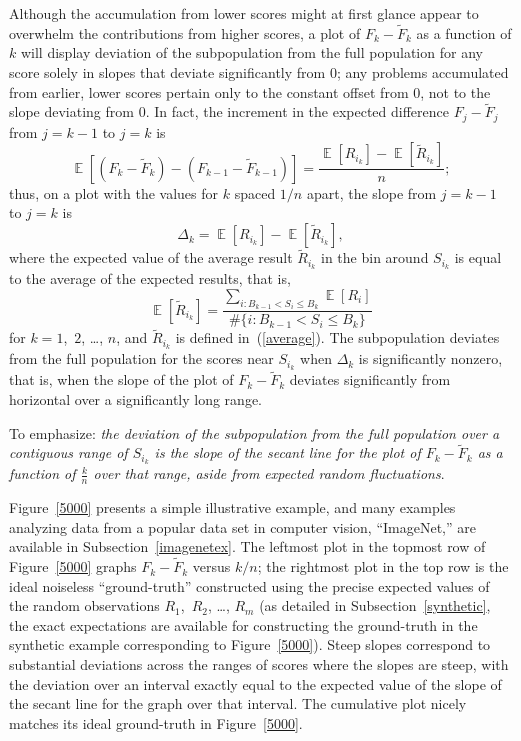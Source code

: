 \documentclass{article}
\DeclareMathOperator{\E}{\mathop{}\mathbb{E}}
\begin{document}
Although the accumulation from lower scores might at first glance appear
to overwhelm the contributions from higher scores,
a plot of $F_k-\tilde{F}_k$ as a function of $k$ will display deviation
of the subpopulation from the full population
for any score solely in slopes that deviate significantly from 0;
any problems accumulated from earlier, lower scores pertain
only to the constant offset from 0, not to the slope deviating from 0.
In fact, the increment in the expected difference $F_j-\tilde{F}_j$
from $j = k-1$ to $j = k$ is
%
\begin{equation}
\E[ (F_k-\tilde{F}_k) - (F_{k-1}-\tilde{F}_{k-1}) ]
= \frac{\E[ R_{i_k} ] - \E[ \tilde{R}_{i_k} ]}{n};
\end{equation}
%
thus, on a plot with the values for $k$ spaced $1/n$ apart,
the slope from $j = k-1$ to $j = k$ is
%
\begin{equation}
\label{delta}
\Delta_k = \E[ R_{i_k} ] - \E[ \tilde{R}_{i_k} ],
\end{equation}
%
where the expected value of the average result $\tilde{R}_{i_k}$
in the bin around $S_{i_k}$ is equal to the average of the expected results,
that is,
%
\begin{equation}
\label{linearity}
\E[ \tilde{R}_{i_k} ] = \frac{\sum_{i : B_{k-1} < S_i \le B_k} \E[ R_i ]}
                             {\#\{i : B_{k-1} < S_i \le B_k\}}
\end{equation}
%
for $k = 1$,~$2$, \dots, $n$,
and $\tilde{R}_{i_k}$ is defined in~(\ref{average}).
The subpopulation deviates from the full population for the scores near
$S_{i_k}$ when $\Delta_k$ is significantly nonzero, that is, when the slope
of the plot of $F_k-\tilde{F}_k$ deviates significantly from horizontal
over a significantly long range.

To emphasize: {\it the deviation of the subpopulation from the full population
over a contiguous range of $S_{i_k}$
is the slope of the secant line for the plot of $F_k-\tilde{F}_k$
as a function of $\frac{k}{n}$ over that range,
aside from expected random fluctuations}.

Figure~\ref{5000} presents a simple illustrative example,
and many examples analyzing data from a popular data set in computer vision,
``ImageNet,'' are available in Subsection~\ref{imagenetex}.
The leftmost plot in the topmost row of Figure~\ref{5000}
graphs $F_k-\tilde{F}_k$ versus $k/n$; the rightmost plot in the top row
is the ideal noiseless ``ground-truth'' constructed using the precise
expected values of the random observations $R_1$,~$R_2$, \dots, $R_m$
(as detailed in Subsection~\ref{synthetic},
the exact expectations are available for constructing the ground-truth
in the synthetic example corresponding to Figure~\ref{5000}).
Steep slopes correspond to substantial deviations across the ranges of scores
where the slopes are steep, with the deviation over an interval exactly equal
to the expected value of the slope of the secant line for the graph
over that interval. The cumulative plot nicely matches its ideal ground-truth
in Figure~\ref{5000}.
\end{document}
